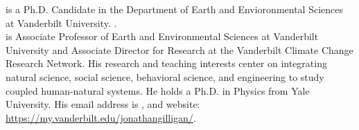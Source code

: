 \documentclass{wscpaperproc}
\theoremstyle{wsc}
\begin{document}
 is a Ph.D. Candidate in the Department of Earth and Envioronmental Sciences at Vanderbilt University. . \\

 is Associate Professor of Earth and Environmental Sciences at Vanderbilt
University and Associate Director for Research at the Vanderbilt Climate Change Research Network. His
research and teaching interests center on integrating natural science, social science, behavioral science, and
engineering to study coupled human-natural systems. He holds a Ph.D. in Physics from Yale University. His
email address is , and website: \url{https://my.vanderbilt.edu/jonathangilligan/}.
\\
\end{document}
